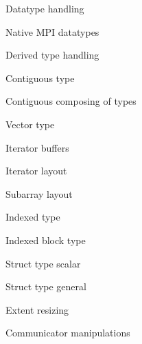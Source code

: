 \documentclass[11pt,headernav]{beamer}
\begin{document}
\begin{numberedframe}{Datatype handling}
  
\end{numberedframe}
\begin{numberedframe}{Native MPI datatypes}
  
\end{numberedframe}
\begin{numberedframe}{Derived type handling}
  
\end{numberedframe}
\begin{numberedframe}{Contiguous type}
  
\end{numberedframe}
\begin{numberedframe}{Contiguous composing of types}
  
\end{numberedframe}
\begin{numberedframe}{Vector type}
  
\end{numberedframe}
\begin{numberedframe}{Iterator buffers}
  
\end{numberedframe}
\begin{numberedframe}{Iterator layout}
  
\end{numberedframe}
\begin{numberedframe}{Subarray layout}
  
\end{numberedframe}
\begin{numberedframe}{Indexed type}
  
\end{numberedframe}
\begin{numberedframe}{Indexed block type}
  
\end{numberedframe}
\begin{numberedframe}{Struct type scalar}
  
\end{numberedframe}
\begin{numberedframe}{Struct type general}
  
\end{numberedframe}
\begin{numberedframe}{Extent resizing}
    
\end{numberedframe}

 {Communicator manipulations}
\end{document}

